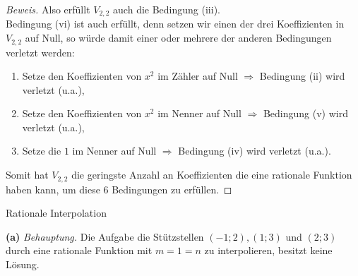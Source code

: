 \documentclass[a4paper]{article}
\newcommand{\beh}{\textit{Behauptung. }}
\newenvironment{Aufgabe}[2][Aufgabe]{\begin{trivlist}
\item[\hskip \labelsep {\bfseries #1}\hskip \labelsep {\bfseries #2.}]}{\end{trivlist}}
\begin{document}
\begin{proof}[Beweis]
    Also erfüllt $V_{2,2}$ auch die Bedingung (iii). \\
    Bedingung (vi) ist auch erfüllt, denn setzen wir einen der drei Koeffizienten in $V_{2,2}$ auf Null, 
    so würde damit einer oder mehrere der anderen Bedingungen verletzt werden: 
    \begin{enumerate}
        \item[(1)] Setze den Koeffizienten von $x^2$ im Zähler auf Null $\Longrightarrow$ Bedingung (ii) wird verletzt (u.a.),
        \item[(2)] Setze den Koeffizienten von $x^2$ im Nenner auf Null $\Longrightarrow$ Bedingung (v) wird verletzt (u.a.),
        \item[(3)] Setze die $1$ im Nenner auf Null $\Longrightarrow$ Bedingung (iv) wird verletzt (u.a.).
    \end{enumerate}

    Somit hat $V_{2,2}$ die 
    geringste Anzahl an Koeffizienten die eine rationale Funktion haben kann, um diese 6 Bedingungen zu erfüllen.
\end{proof}


\begin{Aufgabe}{3}
    Rationale Interpolation
\end{Aufgabe}

\textbf{(a)} \beh Die Aufgabe die Stützstellen $(-1; 2), (1; 3)$ und $(2; 3)$ durch eine rationale Funktion
mit $m = 1 = n$ zu interpolieren, besitzt keine Lösung.
\end{document}
